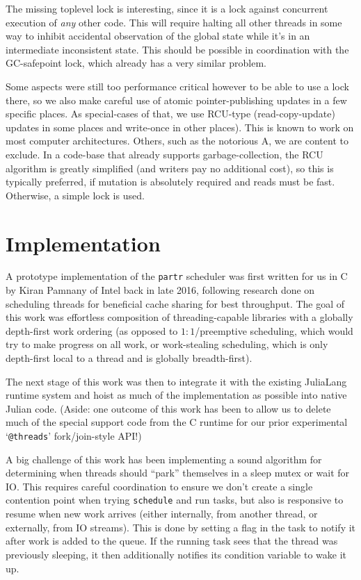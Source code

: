 \documentclass{juliacon}
\begin{document}
The missing toplevel lock is interesting, since it is a lock against concurrent execution of \textit{any} other code. This will require halting all other threads in some way to inhibit accidental observation of the global state while it's in an intermediate inconsistent state. This should be possible in coordination with the GC-safepoint lock, which already has a very similar problem.

Some aspects were still too performance critical however to be able to use a lock there, so we also make careful use of atomic pointer-publishing updates in a few specific places. As special-cases of that, we use RCU-type (read-copy-update) updates in some places and write-once in other places). This is known to work on most computer architectures. Others, such as the notorious A, we are content to exclude. In a code-base that already supports garbage-collection, the RCU algorithm is greatly simplified (and writers pay no additional cost), so this is typically preferred, if mutation is absolutely required and reads must be fast. Otherwise, a simple lock is used.

\section{Implementation}
\label{subsub:implementation}

A prototype implementation of the \verb|partr| scheduler was first written for us in C by Kiran Pamnany of Intel back in late 2016, following research done on scheduling threads for beneficial cache sharing for best throughput\cite{Chen:2007:STC:1248377.1248396}. The goal of this work was effortless composition of threading-capable libraries with a globally depth-first work ordering (as opposed to $1:1$/preemptive scheduling, which would try to make progress on all work, or work-stealing scheduling, which is only depth-first local to a thread and is globally breadth-first).

The next stage of this work was then to integrate it with the existing JuliaLang runtime system and hoist as much of the implementation as possible into native Julian code. (Aside: one outcome of this work has been to allow us to delete much of the special support code from the C runtime for our prior experimental `\verb|@threads|' fork/join-style API!)

A big challenge of this work has been implementing a sound algorithm for determining when threads should ``park'' themselves in a sleep mutex or wait for IO. This requires careful coordination to ensure we don't create a single contention point when trying \verb|schedule| and run tasks, but also is responsive to resume when new work arrives (either internally, from another thread, or externally, from IO streams). This is done by setting a flag in the task to notify it after work is added to the queue. If the running task sees that the thread was previously sleeping, it then additionally notifies its condition variable to wake it up.
\end{document}

